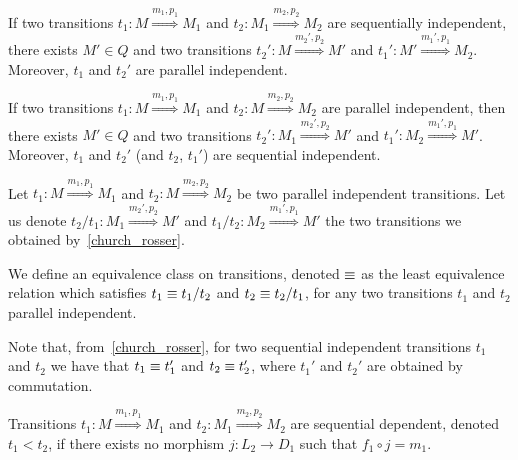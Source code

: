 \begin{lemma}
  \label{church_rosser}
  If two transitions $t_1:M\overset{m_1,p_1}{\Rightarrow} M_1$ and $t_2:M_1\overset{m_2,p_2}{\Rightarrow} M_2$ are sequentially independent, there exists $M'\in Q$ and two transitions $t_2':M\overset{m_2',p_2}{\Rightarrow} M'$ and $t_1':M'\overset{m_1',p_1}{\Rightarrow} M_2$. Moreover, $t_1$ and $t_2'$ are parallel independent.

If two transitions $t_1:M\overset{m_1,p_1}{\Rightarrow} M_1$ and $t_2:M\overset{m_2,p_2}{\Rightarrow} M_2$ are parallel independent, then there exists $M'\in Q$ and two transitions $t_2':M_1\overset{m_2',p_2}{\Rightarrow} M'$ and $t_1':M_2\overset{m_1',p_1}{\Rightarrow} M'$. Moreover, $t_1$ and $t_2'$ (and $t_2$, $t_1'$) are sequential independent.
\end{lemma}

Let $t_1:M\overset{m_1,p_1}{\Rightarrow} M_1$ and $t_2:M\overset{m_2,p_2}{\Rightarrow} M_2$ be two parallel independent transitions.  Let us denote $t_2/t_1:M_1\overset{m_2',p_2}{\Rightarrow} M'$ and $t_1/t_2:M_2\overset{m_1',p_1}{\Rightarrow} M'$ the two transitions we obtained by~\autoref{church_rosser}.

\begin{definition}
We define an equivalence class on transitions, denoted $\equiv$ as the least equivalence relation which satisfies $t_1\equiv t_1/t_2$ and $t_2\equiv t_2/t_1$, for any two transitions $t_1$ and $t_2$ parallel independent.
\end{definition}

Note that, from~\autoref{church_rosser}, for two sequential independent transitions $t_1$ and $t_2$ we have that $t_1\equiv t_1'$ and $t_2\equiv t_2'$, where $t_1'$ and $t_2'$ are obtained by commutation.


\begin{definition}
  \label{def:seq_dep}
  Transitions $t_1:M\overset{m_1,p_1}{\Rightarrow} M_1$ and $t_2:M_1\overset{m_2,p_2}{\Rightarrow} M_2$ are sequential dependent, denoted $t_1 < t_2$, if there exists no morphism $j:L_2\to D_1$ such that $f_1\circ j= m_1$.
\end{definition}

